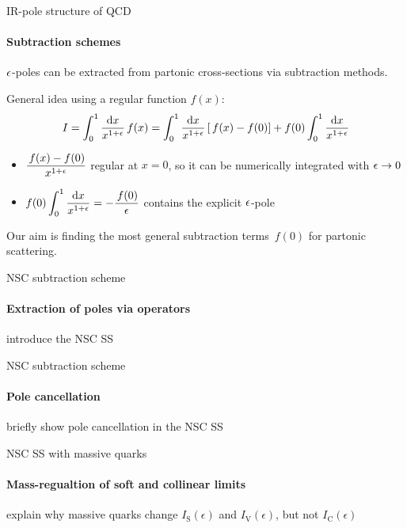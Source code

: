
\begin{frame}{IR-pole structure of QCD}
  \framesubtitle{Subtraction schemes}

  $ \epsilon $-poles can be extracted from partonic cross-sections via subtraction methods.

  General idea using a regular function $ f(x) $:
  \begin{equation*}
    I = \int_0^1 \frac{\mathrm{d} x}{x^{1 + \epsilon}} \,f(x) = \int_0^1 \frac{\mathrm{d} x}{x^{1 + \epsilon}} \left[ \,f(x) - f(0) \right] + f(0) \int_0^1 \frac{\mathrm{d} x}{x^{1 + \epsilon}}
  \end{equation*}
  \begin{itemize}
    \item $ \displaystyle \frac{\,f(x) - f(0)}{x^{1 + \epsilon}} $ regular at $ x = 0 $, so it can be numerically integrated with $ \epsilon \rightarrow 0 $
    \item $ \displaystyle f(0) \int_0^1 \frac{\mathrm{d} x}{x^{1 + \epsilon}} = - \frac{\,f(0)}{\epsilon} $ contains the explicit $ \epsilon $-pole
  \end{itemize}

  Our aim is finding the most general subtraction terms $ \,f(0) $ for partonic scattering.

\end{frame}


\begin{frame}{NSC subtraction scheme}
  \framesubtitle{Extraction of poles via operators}

  introduce the NSC SS

\end{frame}


\begin{frame}{NSC subtraction scheme}
  \framesubtitle{Pole cancellation}

  briefly show pole cancellation in the NSC SS

\end{frame}


\begin{frame}{NSC SS with massive quarks}
  \framesubtitle{Mass-regualtion of soft and collinear limits}

  explain why massive quarks change $ I_\text{S}(\epsilon) $ and $ I_\text{V}(\epsilon) $, but not $ I_\text{C}(\epsilon) $

\end{frame}

